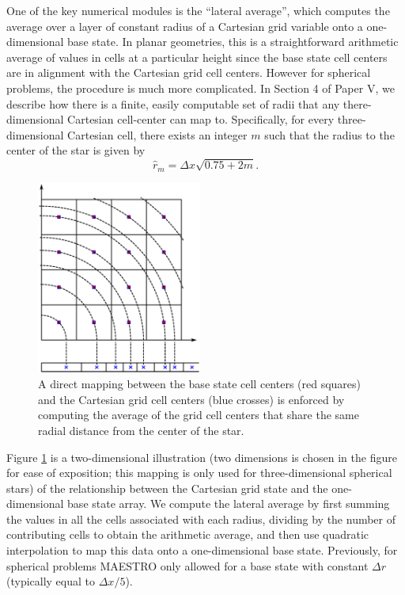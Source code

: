 One of the key numerical modules is the ``lateral average'', which computes the average over a 
layer of constant radius of a Cartesian grid variable onto a one-dimensional base state.
In planar geometries, this is a straightforward arithmetic average of values in cells at
a particular height since the base state cell centers are in alignment
with the Cartesian grid cell centers.
However for spherical problems, the procedure is much more complicated.
In Section 4 of Paper V, we describe how there is a finite, easily computable set of radii that any 
there-dimensional Cartesian cell-center can map to.  
Specifically, for every three-dimensional Cartesian cell, there exists an integer $m$ such that the radius to the center of the star is given by 
\begin{equation}
\hat{r}_m=\Delta x\sqrt{0.75+2m}.\label{eqn:radii}
\end{equation}
\begin{figure}[tb]
\centering
\includegraphics[height=2.5in]{./figs/base_spherical_new}
\caption{\label{Fig:NewBaseGrid}  
A direct mapping between the base state cell centers (red squares) and the Cartesian grid cell centers (blue crosses) 
is enforced by computing the average of the grid cell centers that share the same radial distance from 
the center of the star.}
\end{figure}
Figure \ref{Fig:NewBaseGrid} is a two-dimensional illustration 
(two dimensions is chosen in the figure for ease of exposition; this mapping is only used for three-dimensional spherical stars) 
of the relationship between the Cartesian grid state and the one-dimensional base state array.
We compute the lateral average by first summing the values in all the cells associated with each radius,
dividing by the number of contributing cells to obtain the arithmetic average, and then use quadratic interpolation to map this data onto a one-dimensional base state.
Previously, for spherical problems MAESTRO only allowed for a base state with constant $\Delta r$ (typically equal to $\Delta x/5$).

